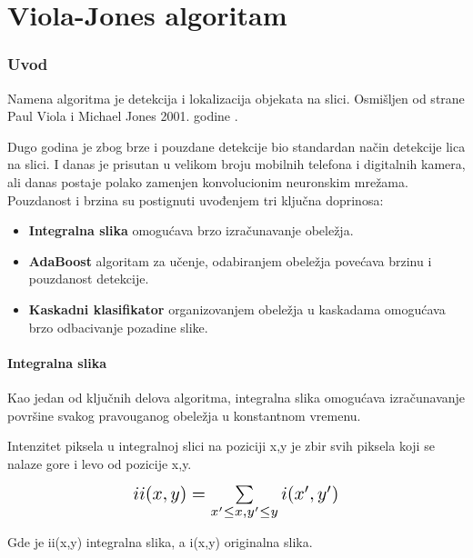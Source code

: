 \part{Viola-Jones algoritam}\label{viola_jones_algorithm}

\section{Uvod} \label{viola_jones_introduction}

Namena algoritma je detekcija i lokalizacija objekata na slici. Osmišljen od
strane Paul Viola i Michael Jones 2001. godine \cite{Viola2001RapidOD}.

Dugo godina je zbog brze i pouzdane detekcije bio standardan način detekcije
lica na slici. I danas je prisutan u velikom broju mobilnih telefona i
digitalnih kamera, ali danas postaje polako zamenjen konvolucionim neuronskim
mrežama. \\

Pouzdanost i brzina su postignuti uvođenjem tri ključna doprinosa:
\begin{itemize}

\item \textbf{Integralna slika} omogućava brzo izračunavanje obeležja.
\item \textbf{AdaBoost} algoritam za učenje, odabiranjem obeležja povećava
  brzinu i pouzdanost detekcije.
\item \textbf{Kaskadni klasifikator} organizovanjem obeležja u kaskadama
  omogućava brzo odbacivanje pozadine slike. \\
\end{itemize}


\subsection{Integralna slika} \label{ii_sec}

Kao jedan od ključnih delova algoritma, integralna slika omogućava izračunavanje
površine svakog pravouganog obeležja u konstantnom vremenu.

Intenzitet piksela u integralnoj slici na poziciji x,y je zbir svih piksela koji
se nalaze gore i levo od pozicije x,y.

\begin{equation}
  \Scale[1.4]{ii(x,y)=\sum\limits_{x'\leq x, y'\leq y} i(x',y')}
  \label{IntegralImage_eq1}
\end{equation}

Gde je ii(x,y) integralna slika, a i(x,y) originalna slika. \\

